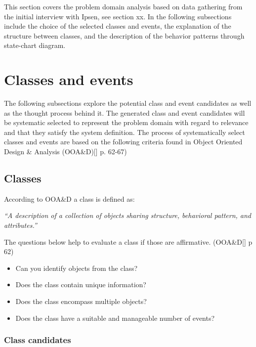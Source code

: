 This section covers the problem domain analysis based on data gathering from the initial interview with Ipsen, see section xx. In the following subsections include the choice of the selected classes and events, the explanation of the structure between classes, and the description of the behavior patterns through state-chart diagram. 

\section{Classes and events}

The following subsections explore the potential class and event candidates as well as the thought process behind it. The generated class and event candidates will be systematic selected to represent the problem domain with regard to relevance and that they satisfy the system definition. The process of systematically select classes and events are based on the following criteria found in Object Oriented Design \& Analysis (OOA\&D)[] p. 62-67)

\subsection{Classes}
According to OOA\&D a class is defined as:

\textit{“A description of a collection of objects sharing structure, behavioral pattern, and attributes.”}

The questions below help to evaluate a class if those are affirmative. (OOA\&D[] p 62)

\begin{itemize}
	\item Can you identify objects from the class?
	\item Does the class contain unique information?
	\item Does the class encompass multiple objects?
	\item Does the class have a suitable and manageable number of events?
\end{itemize}

\subsubsection{Class candidates}



